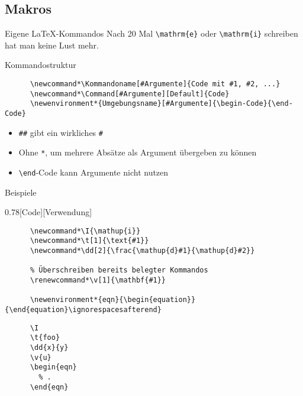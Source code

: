 \subsection{Makros}

\begin{frame}[fragile]{Eigene \LaTeX-Kommandos}
  Nach 20 Mal \lstinline+\mathrm{e}+ oder \lstinline+\mathrm{i}+ schreiben hat man keine Lust mehr.
  \vspace{1em}
  \begin{block}{Kommandostruktur}
    \begin{lstlisting}
      \newcommand*\Kommandoname[#Argumente]{Code mit #1, #2, ...}
      \newcommand*\Command[#Argumente][Default]{Code}
      \newenvironment*{Umgebungsname}[#Argumente]{\begin-Code}{\end-Code}
    \end{lstlisting}
  \end{block}
  \begin{itemize}
    \item \verb+##+ gibt ein wirkliches \verb+#+
    \item Ohne \texttt{*}, um mehrere Absätze als Argument übergeben zu können
    \item \lstinline+\end+-Code kann Argumente nicht nutzen
  \end{itemize}
\end{frame}

\begin{frame}[fragile]{Beispiele}
  \begin{CodeExample}{0.78}[Code][Verwendung]
    \begin{lstlisting}
      \newcommand*\I{\mathup{i}}
      \newcommand*\t[1]{\text{#1}}
      \newcommand*\dd[2]{\frac{\mathup{d}#1}{\mathup{d}#2}}

      % Überschreiben bereits belegter Kommandos
      \renewcommand*\v[1]{\mathbf{#1}}

      \newenvironment*{eqn}{\begin{equation}}{\end{equation}\ignorespacesafterend}
    \end{lstlisting}
  \CodeResult
    \begin{lstlisting}
      \I
      \t{foo}
      \dd{x}{y}
      \v{u}
      \begin{eqn}
        % .
      \end{eqn}
    \end{lstlisting}
  \end{CodeExample}
\end{frame}

